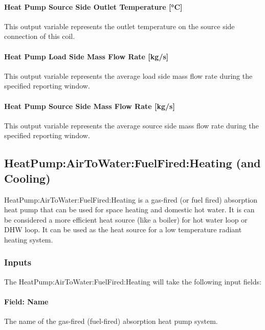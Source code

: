 \paragraph{Heat Pump Source Side Outlet Temperature {[}°C{]}}\label{plhp_eir_outputs_t_source_out}

This output variable represents the outlet temperature on the source side connection of this coil.

\paragraph{Heat Pump Load Side Mass Flow Rate {[}kg/s{]}}\label{plhp_eir_outputs_load_flow}

This output variable represents the average load side mass flow rate during the specified reporting window.

\paragraph{Heat Pump Source Side Mass Flow Rate {[}kg/s{]}}\label{plhp_eir_outputs_src_flow}

This output variable represents the average source side mass flow rate during the specified reporting window.

\subsection{HeatPump:AirToWater:FuelFired:Heating (and Cooling)}

HeatPump:AirToWater:FuelFired:Heating is a gas-fired (or fuel fired) absorption heat pump that can be used for space heating and domestic hot water. It is can be considered a more efficient heat source (like a boiler) for hot water loop or DHW loop. It can be used as the heat source for a low temperature radiant heating system. 

\subsubsection{Inputs}

The HeatPump:AirToWater:FuelFired:Heating will take the following input fields:

\paragraph{Field: Name}
The name of the gas-fired (fuel-fired) absorption heat pump system.


